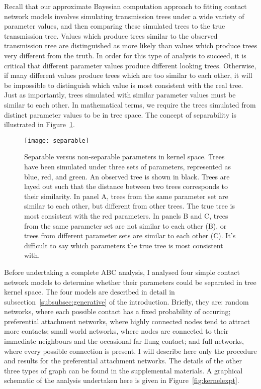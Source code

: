 Recall that our approximate Bayesian computation approach to fitting contact
network models involves simulating transmission trees under a wide variety of
parameter values, and then comparing these simulated trees to the true
transmission tree. Values which produce trees similar to the observed
transmission tree are distinguished as more likely than values which produce
trees very different from the truth. In order for this type of analysis to
succeed, it is critical that different parameter values produce different
looking trees. Otherwise, if many different values produce trees which are too
similar to each other, it will be impossible to distinguish which value is most
consistent with the real tree. Just as importantly, trees simulated with
similar parameter values must be similar to each other. In mathematical terms,
we require the trees simulated from distinct parameter values to be
 in tree space. The concept of separability is illustrated in
Figure~\ref{fig:separable}.

\begin{figure}[ht]
  \centering
  \texttt{[image: separable]}
  \caption[Separable versus non-separable pararameters in kernel space]{
    Separable versus non-separable parameters in kernel space. Trees have been
    simulated under three sets of parameters, represented as blue, red, and
    green. An observed tree is shown in black. Trees are layed out such that
    the distance between two trees corresponds to their similarity. In panel A,
    trees from the same parameter set are similar to each other, but different
    from other trees. The true tree is most consistent with the red parameters.
    In panels B and C, trees from the same parameter set are not similar to
    each other (B), or trees from different parameter sets are similar to each
    other (C). It's difficult to say which parameters the true tree is most
    consistent with.
  }
  \label{fig:separable}
\end{figure}

Before undertaking a complete ABC analysis, I analysed four simple contact
network models to determine whether their parameters could be separated in tree
kernel space. The four models are described in detail in
subsection~\ref{subsubsec:generative} of the introduction. Briefly, they are:
random networks, where each possible contact has a fixed probability of
occuring; preferential attachment networks, where highly connected nodes tend
to attract more contacts; small world networks, where nodes are connected to
their immediate neighbours and the occasional far-flung contact; and full
networks, where every possible connection is present. I will describe here only
the procedure and results for the preferential attachment networks. The details
of the other three types of graph can be found in the supplemental materials. A
graphical schematic of the analysis undertaken here is given in
Figure~\ref{fig:kernelexpt}.

